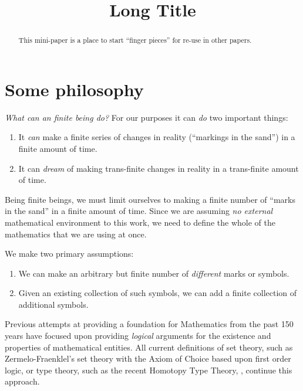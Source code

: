 \documentclass[a4paper,openany]{amsart}
\begin{document}
\sloppy

\title[Short Title]{Long Title}

%

\begin{abstract}
This mini-paper is a place to start ``finger pieces'' for re-use in other
papers.
\end{abstract} 
\maketitle 
\tableofcontents 


\section{Some philosophy}

\emph{What can an finite being do?} For our purposes it can \emph{do} two
important things:
\begin{enumerate}
\item It \emph{can} make a finite series of changes in reality (``markings in
the sand'') in a finite amount of time.
\item It can \emph{dream} of making trans-finite changes in reality in a
trans-finite amount of time.
\end{enumerate}

Being finite beings, we must limit ourselves to making a finite number of
``marks in the sand'' in a finite amount of time. Since we are assuming \emph{no
external} mathematical environment to this work, we need to define the whole of
the mathematics that we are using at once.

We make two primary assumptions:
\begin{enumerate}
\item We can make an arbitrary but finite number of \emph{different} marks or
symbols.
\item Given an existing collection of such symbols, we can add a finite
collection of additional symbols.
\end{enumerate}

Previous attempts at providing a foundation for Mathematics from the past 150
years have focused upon providing \emph{logical} arguments for the existence and
properties of mathematical entities. All current definitions of set theory, such
as Zermelo-Fraenklel's set theory with the Axiom of Choice based upon first
order logic, or type theory, such as the recent Homotopy Type Theory,
\cite{awodeyCoquandVoevodsky2013homotopyTypeTheory}, continue this approach.
\end{document}
